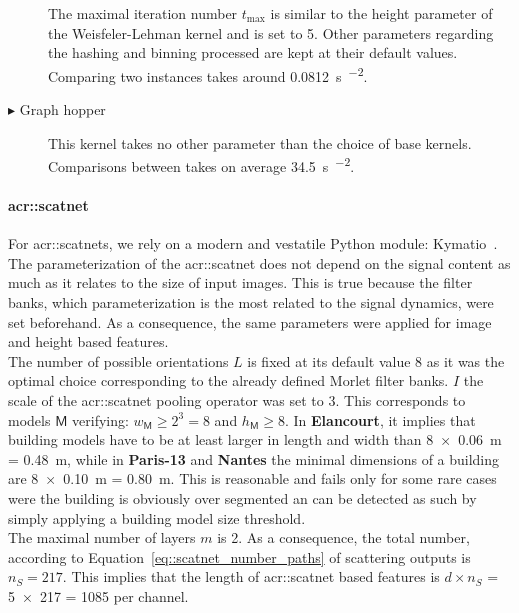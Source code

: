 \begin{description}
                                The maximal iteration number \(t_{\max}\) is similar to the height parameter of the Weisfeler-Lehman kernel and is set to 5.
                                Other parameters regarding the hashing and binning processed are kept at their default values.
                                Comparing two instances takes around \SI[scientific-notation = true]{0.0812}{\s\per\building\squared}.
                    \item[\(\blacktriangleright\) Graph hopper] This kernel takes no other parameter than the choice of base kernels.
                                Comparisons between takes on average \SI{34.5}{\s\per\building\squared}.
                \end{description}

            \paragraph{\gls*{acr::scatnet}}
                For \glspl{acr::scatnet}, we rely on a modern and vestatile Python module: Kymatio~\parencite{andreux2018kymatio}.
                The parameterization of the \gls{acr::scatnet} does not depend on the signal content as much as it relates to the size of input images.
                This is true because the filter banks, which parameterization is the most related to the signal dynamics, were set beforehand.
                As a consequence, the same parameters were applied for image and height based features.\\

                The number of possible orientations \(L\) is fixed at its default value 8 as it was the optimal choice corresponding to the already defined Morlet filter banks.
                \(I\) the scale of the \gls{acr::scatnet} pooling operator was set to 3.
                This corresponds to models \(\mathsf{M}\) verifying: \(w_{\mathsf{M}} \geq 2^3 = 8\) and \(h_{\mathsf{M}} \geq 8\).
                In \textbf{Elancourt}, it implies that building models have to be at least larger in length and width than \SI{8 x 0.06}{\m} = \SI{0.48}{\m}, while in \textbf{Paris-13} and \textbf{Nantes} the minimal dimensions of a building are \SI{8 x 0.10}{\m} = \SI{0.80}{\m}.
                This is reasonable and fails only for some rare cases were the building is obviously over segmented an can be detected as such by simply applying a building model size threshold.\\
                The maximal number of layers \(m\) is 2.
                As a consequence, the total number, according to Equation~\ref{eq::scatnet_number_paths} of scattering outputs is \(n_S = 217\).
                This implies that the length of \gls{acr::scatnet} based features is \(d \times n_S\) = \num{5 x 217} = 1085 per channel.\\

